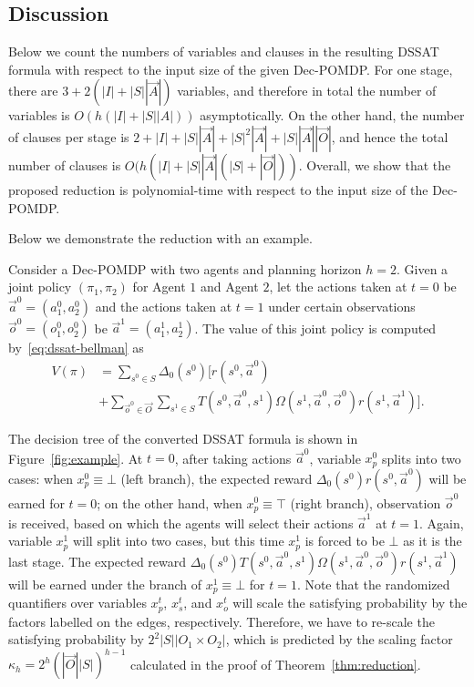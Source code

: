 \subsection{Discussion}
Below we count the numbers of variables and clauses in the resulting DSSAT formula with respect to the input size of the given Dec-POMDP.
For one stage, there are $3+2(|I|+|S||\vec{A}|)$ variables, and therefore in total the number of variables is $O(h(|I|+|S||A|))$ asymptotically.
On the other hand, the number of clauses per stage is $2+|I|+|S||\vec{A}|+|S|^2|\vec{A}|+|S||\vec{A}||\vec{O}|$, and hence the total number of clauses is $O(h(|I|+|S||\vec{A}|(|S|+|\vec{O}|))$.
Overall, we show that the proposed reduction is polynomial-time with respect to the input size of the Dec-POMDP.

Below we demonstrate the reduction with an example.

\begin{example}
    Consider a Dec-POMDP with two agents and planning horizon $h=2$.
    Given a joint policy $(\pi_1,\pi_2)$ for Agent $1$ and Agent $2$, let the actions taken at $t=0$ be $\vec{a}^0=(a_1^0,a_2^0)$ and the actions taken at $t=1$ under certain observations $\vec{o}^0=(o_1^0,o_2^0)$ be $\vec{a}^1=(a_1^1,a_2^1)$.
    The value of this joint policy is computed by~\cref{eq:dssat-bellman} as
    \begin{align*}
        V(\pi) & =\sum_{s^0\in S}\Delta_0(s^0)[r(s^0,\vec{a}^0)                                                                  \\
               & +\sum_{\vec{o}^0\in\vec{O}}\sum_{s^1\in S}T(s^0,\vec{a}^0,s^1)\Omega(s^1,\vec{a}^0,\vec{o}^0)r(s^1,\vec{a}^1)].
    \end{align*}

    The decision tree of the converted DSSAT formula is shown in Figure~\ref{fig:example}.
    At $t=0$, after taking actions $\vec{a}^0$, variable $x_p^0$ splits into two cases: when $x_p^0\equiv \bot$ (left branch), the expected reward $\Delta_0(s^0)r(s^0,\vec{a}^0)$ will be earned for $t=0$; on the other hand, when $x_p^0\equiv \top$ (right branch), observation $\vec{o}^0$ is received, based on which the agents will select their actions $\vec{a}^1$ at $t=1$.
    Again, variable $x_p^1$ will split into two cases, but this time $x_p^1$ is forced to be $\bot$ as it is the last stage.
    The expected reward $\Delta_0(s^0)T(s^0,\vec{a}^0,s^1)\Omega(s^1,\vec{a}^0,\vec{o}^0)r(s^1,\vec{a}^1)$ will be earned under the branch of $x_p^1\equiv\bot$ for $t=1$.
    Note that the randomized quantifiers over variables $x_p^t$, $x_s^t$, and $x_o^t$ will scale the satisfying probability by the factors labelled on the edges, respectively.
    Therefore, we have to re-scale the satisfying probability by $2^2|S||O_1\times O_2|$, which is predicted by the scaling factor $\kappa_{h}=2^h(|\vec{O}||S|)^{h-1}$ calculated in the proof of Theorem~\ref{thm:reduction}.
\end{example}